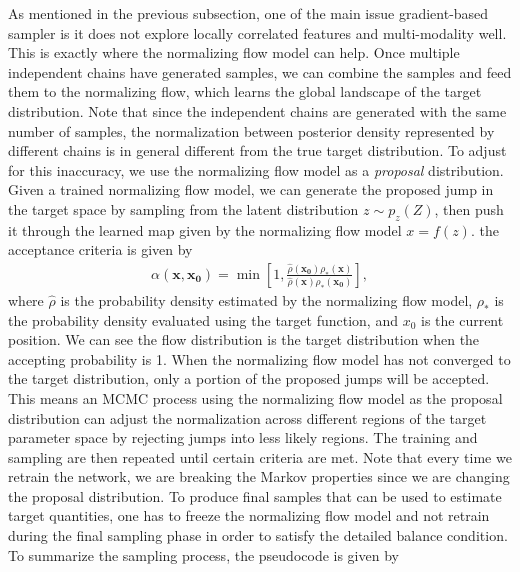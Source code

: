 \documentclass[twocolumn]{aastex631}
\begin{document}
As mentioned in the previous subsection, one of the main issue gradient-based
sampler is it does not explore locally correlated features and multi-modality well. This
is exactly where the normalizing flow model can help. Once multiple independent
chains have generated samples, we can combine the samples and feed them to the
normalizing flow, which learns the global landscape of the target
distribution. Note that since the independent chains are generated with the same
number of samples, the normalization between posterior density represented by
different chains is in general different from the true target distribution. To
adjust for this inaccuracy, we use the normalizing flow model as a
\textit{proposal} distribution. Given a trained normalizing flow model, we can
generate the proposed jump in the target space by sampling from the latent
distribution $z \sim p_z(Z)$, then push it through the learned map given by the
normalizing flow model $x=f(z)$. the acceptance criteria is given by
\begin{align}
    \alpha(\mathbf{x},\mathbf{x_0}) = \min \left[ 1, \frac{\hat{\rho}(\mathbf{x_0})\rho_*(\mathbf{x})}{\hat{\rho}(\mathbf{x})\rho_*(\mathbf{x_0})}\right],
\end{align}
where $\hat{\rho}$ is the probability density estimated by the normalizing flow
model, $\rho_*$ is the probability density evaluated using the target function,
and $x_0$ is the current position. We can see the flow distribution is the
target distribution when the accepting probability is 1. When the normalizing
flow model has not converged to the target distribution, only a portion of the
proposed jumps will be accepted. This means an MCMC process using the normalizing
flow model as the proposal distribution can adjust the normalization across
different regions of the target parameter space by rejecting jumps into less
likely regions. The training and sampling are then repeated until certain
criteria are met. Note that every time we retrain the network, we are breaking the
Markov properties since we are changing the proposal distribution. To produce
final samples that can be used to estimate target quantities, one has to freeze
the normalizing flow model and not retrain during the final sampling phase in order to satisfy the detailed balance condition.
To summarize the sampling process, the pseudocode is given by
\end{document}
